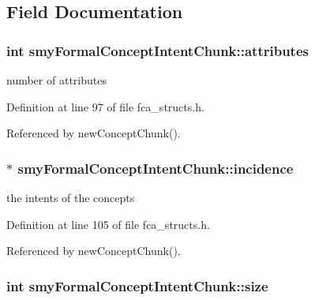 \subsection{\-Field \-Documentation}
\hypertarget{structsmyFormalConceptIntentChunk_a5246108db3d065d2b9c46fedfc88dc0e}{
\subsubsection[{attributes}]{\setlength{\rightskip}{0pt plus 5cm}int {\bf smy\-Formal\-Concept\-Intent\-Chunk\-::attributes}}}\label{structsmyFormalConceptIntentChunk_a5246108db3d065d2b9c46fedfc88dc0e}


number of attributes 



\-Definition at line 97 of file fca\-\_\-structs.\-h.



\-Referenced by new\-Concept\-Chunk().

\hypertarget{structsmyFormalConceptIntentChunk_a1777b5eadbd74c4659580968817b3424}{
\subsubsection[{incidence}]{$\ast$ {\bf smy\-Formal\-Concept\-Intent\-Chunk\-::incidence}}}\label{structsmyFormalConceptIntentChunk_a1777b5eadbd74c4659580968817b3424}


the intents of the concepts 



\-Definition at line 105 of file fca\-\_\-structs.\-h.



\-Referenced by new\-Concept\-Chunk().

\hypertarget{structsmyFormalConceptIntentChunk_a39483f44afbcd1de56c41243c7a442aa}{
\subsubsection[{size}]{\setlength{\rightskip}{0pt plus 5cm}int {\bf smy\-Formal\-Concept\-Intent\-Chunk\-::size}}}\label{structsmyFormalConceptIntentChunk_a39483f44afbcd1de56c41243c7a442aa}


